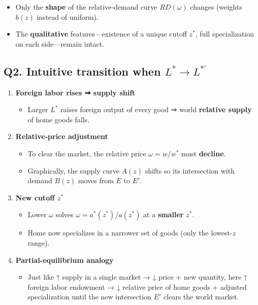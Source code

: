 \documentclass[
]{article}
\providecommand{\tightlist}{%
  \setlength{\itemsep}{0pt}\setlength{\parskip}{0pt}}
\begin{document}
\begin{enumerate}
  \begin{itemize}
  \tightlist
  \item
    Only the \textbf{shape} of the relative‐demand curve \(RD(\omega)\)
    changes (weights \(b(z)\) instead of uniform).\\
  \item
    The \textbf{qualitative} features---existence of a unique cutoff
    \(z^*\), full specialization on each side---remain intact.
  \end{itemize}
\end{enumerate}

\subsection{\texorpdfstring{Q2. Intuitive transition when
\(L^*\to L^{*\prime}\)}{Q2. Intuitive transition when L\^{}*\textbackslash to L\^{}\{*\textbackslash prime\}}}\label{q2.-intuitive-transition-when-lto-lprime}

\begin{enumerate}
\def\labelenumi{\arabic{enumi}.}
\tightlist
\item
  \textbf{Foreign labor rises ⇒ supply shift}

  \begin{itemize}
  \tightlist
  \item
    Larger \(L^*\) raises foreign output of every good ⇒ world
    \textbf{relative supply} of home goods falls.
  \end{itemize}
\item
  \textbf{Relative‐price adjustment}

  \begin{itemize}
  \tightlist
  \item
    To clear the market, the relative price \(\omega=w/w^*\) must
    \textbf{decline}.\\
  \item
    Graphically, the supply curve \(A(z)\) shifts so its intersection
    with demand \(B(z)\) moves from \(E\) to \(E'\).
  \end{itemize}
\item
  \textbf{New cutoff \(z^*\)}

  \begin{itemize}
  \tightlist
  \item
    Lower \(\omega\) solves \(\omega=a^*(z^*)/a(z^*)\) at a
    \textbf{smaller} \(z^*\).\\
  \item
    Home now specializes in a narrower set of goods (only the
    lowest-\(z\) range).
  \end{itemize}
\item
  \textbf{Partial-equilibrium analogy}

  \begin{itemize}
  \tightlist
  \item
    Just like ↑ supply in a single market → ↓ price + new quantity, here
    ↑ foreign labor endowment → ↓ relative price of home goods +
    adjusted specialization until the new intersection \(E'\) clears the
    world market.
  \end{itemize}
\end{enumerate}
\end{document}
